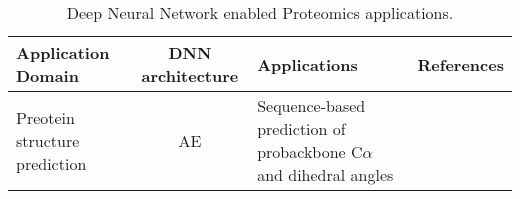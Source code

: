 \begin{table}[h!]
\centering
\begin{tabular}{|| l | c | l | l ||}
    \hline
    Application Domain & DNN architecture & Applications & References\\
    \hline \hline
    Preotein structure prediction & AE & Sequence-based prediction of probackbone C$\alpha$ and dihedral angles & \\
    \hline
\end{tabular}
\caption{Deep Neural Network enabled Proteomics applications.}
\label{tab:PS-DNN}
\end{table}